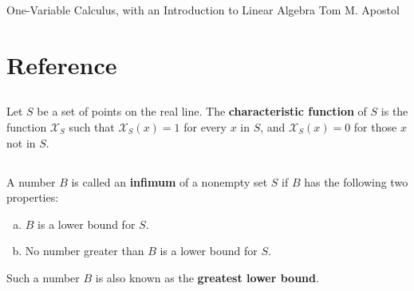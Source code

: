 \documentclass{report}
\begin{document}
\header
  {One-Variable Calculus, with an Introduction to Linear Algebra}
  {Tom M. Apostol}

\tableofcontents

\begingroup
\renewcommand\thechapter{R}
\setcounter{chapter}{0}
\addtocounter{chapter}{-1}

\chapter{Reference}%
\label{chap:reference}

\section{}%
\label{ref:characteristic-function}

Let $S$ be a set of points on the real line.
The \textbf{characteristic function} of $S$ is the function $\mathcal{X}_S$ such
  that $\mathcal{X}_S(x) = 1$ for every $x$ in $S$, and $\mathcal{X}_S(x) = 0$
  for those $x$ not in $S$.

\begin{definition}


\end{definition}

\section{}%
\label{ref:infimum}

A number $B$ is called an \textbf{infimum} of a nonempty set $S$ if $B$ has
  the following two properties:
  \begin{enumerate}[(a)]
    \item $B$ is a lower bound for $S$.
    \item No number greater than $B$ is a lower bound for $S$.
  \end{enumerate}
Such a number $B$ is also known as the \textbf{greatest lower bound}.

\begin{definition}


\end{definition}

\section{}%
\label{ref:integrable}
\end{document}
